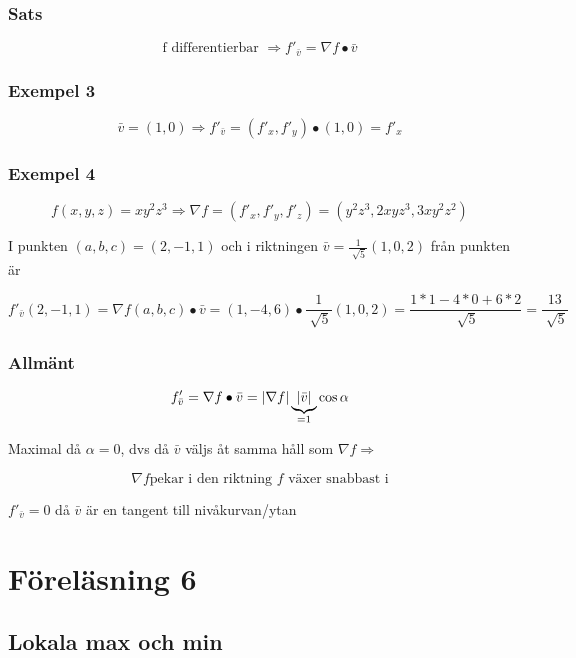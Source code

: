 \documentclass{article}
\DeclarePairedDelimiter \abs{\lvert}{\rvert}
\let\oldsqrt\sqrt
\renewcommand*{\sqrt}[2][\ ]{\oldsqrt[#1]{#2} }
\begin{document}
\newpage
\subsubsection{Sats}
\begin{framed}
\[\text{f differentierbar }\Rightarrow
f'_{\bar{v}} = \nabla f \bullet \bar{v}\]
\end{framed}

\subsubsection{Exempel 3}
\[ \bar{v} = (1,0) \Rightarrow f'_{\bar{v}} = (f'_x,f'_y) \bullet (1,0) = f'_x \]

\subsubsection{Exempel 4}
\[ f(x,y,z) = xy^2z^3 \Rightarrow \nabla f = (f'_x,f'_y,f'_z) = (y^2z^3,2xyz^3,3xy^2z^2) \]

I punkten \((a,b,c) = (2,-1,1)\) och i riktningen \(\bar{v} = \frac{1}{\sqrt{5}}(1,0,2)\) från punkten är 

\[f'_{\bar{v}}(2,-1,1) = \nabla f(a,b,c) \bullet \bar{v} = (1,-4,6) \bullet \frac{1}{\sqrt{5}}(1,0,2) 
= \frac{1 * 1 - 4 * 0 + 6 * 2}{\sqrt{5}} = \frac{13}{\sqrt{5}}\]

\subsubsection{Allmänt}

\[
	f'_{\bar{v}} = \nabla f \bullet \bar{v} = \abs{\nabla f} \underbrace{\abs{\bar{v}}}_{=1} \cos{\alpha}
\]

Maximal då \(\alpha =0\), dvs då \(\bar{v}\) väljs åt samma håll som \(\nabla f \Rightarrow\)

\begin{framed}
\[\nabla f \text{pekar i den riktning } f \text{ växer snabbast i} \]
\end{framed}

\(f'_{\bar{v}} = 0\) då \(\bar{v}\) är en tangent till nivåkurvan/ytan







\newpage
\section{Föreläsning 6}
\subsection{Lokala max och min}
\end{document}
